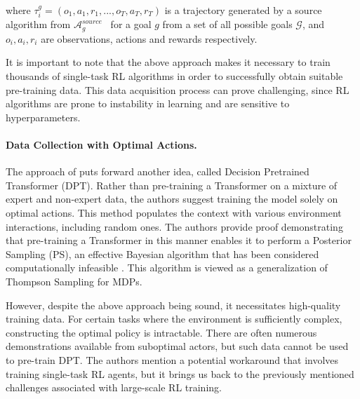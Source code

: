 \documentclass{article}
\theoremstyle{plain}
\theoremstyle{definition}
\theoremstyle{remark}
\begin{document}
where $\tau_i^g = \left( o_1, a_1, r_1, ..., o_T, a_T, r_T  \right)$ is a trajectory generated by a source algorithm from $\mathcal{A}^{source}_g$ \ for a goal $g$ from a set of all possible goals $\mathcal{G}$, and $o_i, a_i, r_i$ are observations, actions and rewards respectively.



It is important to note that the above approach makes it necessary to train thousands of single-task RL algorithms in order to successfully obtain suitable pre-training data. This data acquisition process can prove challenging, since RL algorithms are prone to instability in learning and are sensitive to hyperparameters.

\paragraph{Data Collection with Optimal Actions.}
The approach of \citet{lee2023supervised} puts forward another idea, called Decision Pretrained Transformer (DPT). Rather than pre-training a Transformer on a mixture of expert and non-expert data, the authors suggest training the model solely on optimal actions. This method populates the context with various environment interactions, including random ones. The authors provide proof demonstrating that pre-training a Transformer in this manner enables it to perform a Posterior Sampling (PS), an effective Bayesian algorithm that has been considered computationally infeasible \cite{osband2013more}. This algorithm is viewed as a generalization of Thompson Sampling for MDPs. 

However, despite the above approach being sound, it necessitates high-quality training data. For certain tasks where the environment is sufficiently complex, constructing the optimal policy is intractable. There are often numerous demonstrations available from suboptimal actors, but such data cannot be used to pre-train DPT. The authors mention a potential workaround that involves training single-task RL agents, but it brings us back to the previously mentioned challenges associated with large-scale RL training.
\end{document}
